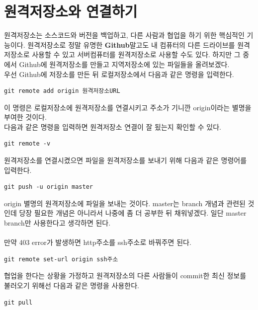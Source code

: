 \documentclass[letterpaper,12pt]{article}
\begin{document}
\section{원격저장소와 연결하기}
원격저장소는 소스코드와 버전을 백업하고, 다른 사람과 협업을 하기 위한 핵심적인 기능이다. 원격저장소로 정말 유명한 \textbf{Github}말고도 내 컴퓨터의 다른 드라이브를 원격저장소로 사용할 수 있고 서버컴퓨터를 원격저장소로 사용할 수도 있다. 하지만 그 중에서 Github에 원격저장소를 만들고 지역저장소에 있는 파일들을 올려보겠다. 
\\ 우선 Github에 저장소를 만든 뒤 로컬저장소에서 다음과 같은 명령을 입력한다.
\begin{verbatim}
git remote add origin 원격저장소URL
\end{verbatim}
이 명령은 로컬저장소에 원격저장소를 연결시키고 주소가 기니깐 origin이라는 별명을 부여한 것이다.
\\다음과 같은 명령을 입력하면 원격저장소 연결이 잘 됬는지 확인할 수 있다.
\begin{verbatim}
git remote -v 
\end{verbatim}
원격저장소를 연결시켰으면 파일을 원격저장소를 보내기 위해 다음과 같은 명령어를 입력한다.
\begin{verbatim}
git push -u origin master 
\end{verbatim}
origin 별명의 원격저장소에 파일을 보내는 것이다. master는 branch 개념과 관련된 것인데 당장 필요한 개념은 아니라서 나중에 좀 더 공부한 뒤 채워넣겠다. 일단 master branch만 사용한다고 생각하면 된다.
\\\\만약 403 error가 발생하면 http주소를 ssh주소로 바꿔주면 된다.
\begin{verbatim}
git remote set-url origin ssh주소
\end{verbatim}
협업을 한다는 상황을 가정하고 원격저장소의 다른 사람들이 commit한 최신 정보를 불러오기 위해선 다음과 같은 명령을 사용한다.
\begin{verbatim}
git pull
\end{verbatim}
\end{document}
